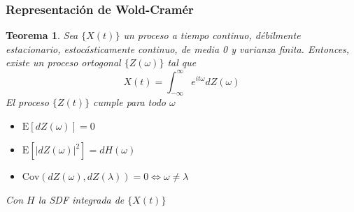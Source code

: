 \documentclass{beamer}
\newtheorem{thrm}{Teorema}
\newcommand{\R}{\mathbb{R}}
\newcommand{\intR}{\int_{-\infty}^{\infty}}
\newcommand{\intPI}{\int_{-\pi}^{\pi}}
\newcommand{\E}[1]{\mathrm{E}\left[ #1 \right]}
\newcommand{\Cov}[1]{\mathrm{Cov}\left( #1 \right)}
\newcommand{\abso}[1]{\left| #1 \right|}
\begin{document}


\begin{frame}\frametitle{Representaci\'on de Wold-Cram\'er}
\begin{thrm}
Sea $\{X(t)\}$ un proceso a tiempo continuo, d\'ebilmente estacionario, estoc\'asticamente 
continuo, de media 0 y varianza finita. Entonces, existe un proceso ortogonal $\{Z(\omega)\}$ tal 
que
\begin{equation*}
X(t) = \intR e^{i t \omega} dZ(\omega)
\end{equation*}
El proceso $\{Z(t)\}$ cumple para todo $\omega$
\begin{itemize}
\item $\E{dZ(\omega)} = 0$
\item $\E{\abso{dZ(\omega)}^{2}} = dH(\omega)$
\item $\Cov{dZ(\omega),dZ(\lambda)} = 0 \Leftrightarrow \omega \neq \lambda$
\end{itemize}
Con $H$ la SDF integrada de $\{X(t)\}$
\end{thrm}
\end{frame}
\end{document}
